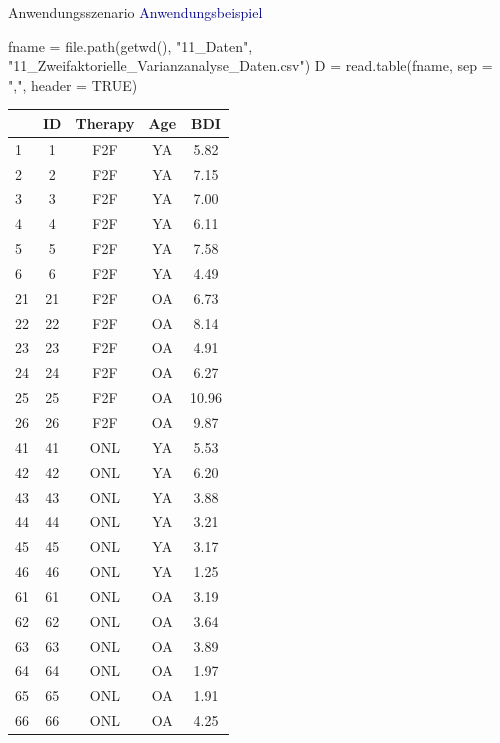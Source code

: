 \documentclass[
  8pt,
  ignorenonframetext,
]{beamer}
\newenvironment{Shaded}{\begin{snugshade}}{\end{snugshade}}
\newcommand{\AttributeTok}[1]{\textcolor[rgb]{0.77,0.63,0.00}{#1}}
\newcommand{\ConstantTok}[1]{\textcolor[rgb]{0.00,0.00,0.00}{#1}}
\newcommand{\FunctionTok}[1]{\textcolor[rgb]{0.00,0.00,0.00}{#1}}
\newcommand{\NormalTok}[1]{#1}
\newcommand{\OtherTok}[1]{\textcolor[rgb]{0.56,0.35,0.01}{#1}}
\newcommand{\StringTok}[1]{\textcolor[rgb]{0.31,0.60,0.02}{#1}}
\begin{document}
\begin{frame}[fragile]{Anwendungsszenario}
\protect\hypertarget{anwendungsszenario-9}{}
\textcolor{darkblue}{Anwendungsbeispiel} \vspace{1mm} 
\tiny

\begin{Shaded}
\begin{Highlighting}[]
\NormalTok{fname       }\OtherTok{=} \FunctionTok{file.path}\NormalTok{(}\FunctionTok{getwd}\NormalTok{(), }\StringTok{"11\_Daten"}\NormalTok{, }\StringTok{"11\_Zweifaktorielle\_Varianzanalyse\_Daten.csv"}\NormalTok{)}
\NormalTok{D           }\OtherTok{=} \FunctionTok{read.table}\NormalTok{(fname, }\AttributeTok{sep =} \StringTok{","}\NormalTok{, }\AttributeTok{header =} \ConstantTok{TRUE}\NormalTok{)}
\end{Highlighting}
\end{Shaded}

\begin{longtable}[]{@{}lcccc@{}}
\toprule
& ID & Therapy & Age & BDI \\
\midrule
\endhead
1 & 1 & F2F & YA & 5.82 \\
2 & 2 & F2F & YA & 7.15 \\
3 & 3 & F2F & YA & 7.00 \\
4 & 4 & F2F & YA & 6.11 \\
5 & 5 & F2F & YA & 7.58 \\
6 & 6 & F2F & YA & 4.49 \\
21 & 21 & F2F & OA & 6.73 \\
22 & 22 & F2F & OA & 8.14 \\
23 & 23 & F2F & OA & 4.91 \\
24 & 24 & F2F & OA & 6.27 \\
25 & 25 & F2F & OA & 10.96 \\
26 & 26 & F2F & OA & 9.87 \\
41 & 41 & ONL & YA & 5.53 \\
42 & 42 & ONL & YA & 6.20 \\
43 & 43 & ONL & YA & 3.88 \\
44 & 44 & ONL & YA & 3.21 \\
45 & 45 & ONL & YA & 3.17 \\
46 & 46 & ONL & YA & 1.25 \\
61 & 61 & ONL & OA & 3.19 \\
62 & 62 & ONL & OA & 3.64 \\
63 & 63 & ONL & OA & 3.89 \\
64 & 64 & ONL & OA & 1.97 \\
65 & 65 & ONL & OA & 1.91 \\
66 & 66 & ONL & OA & 4.25 \\
\bottomrule
\end{longtable}
\end{frame}
\end{document}
